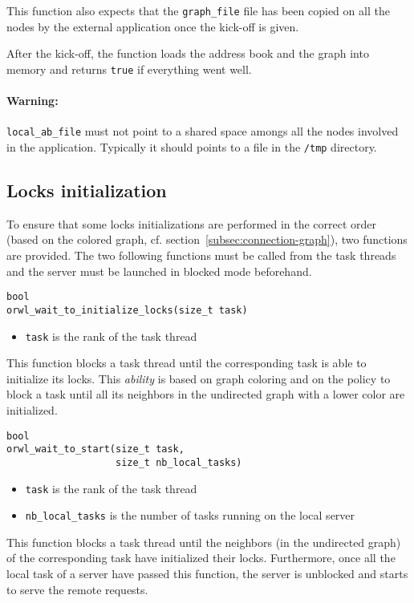 \documentclass[10pt]{article}
\begin{document}
This function also expects that the \texttt{graph\_file} file has been
copied on all the nodes by the external application once the kick-off
is given.

After the kick-off, the function loads the address book and the graph
into memory and returns \texttt{true} if everything went well.

\paragraph{Warning:} \texttt{local\_ab\_file} must not point to a
shared space amongs all the nodes involved in the
application. Typically it should points to a file in the \texttt{/tmp}
directory. 

\subsection{Locks initialization}
To ensure that some locks initializations are performed in the
correct order (based on the colored graph,
cf. section~\ref{subsec:connection-graph}), two functions are
provided. The two following functions must be called from the task
threads and the server must be launched in blocked mode beforehand.

\begin{verbatim}
bool
orwl_wait_to_initialize_locks(size_t task)
\end{verbatim}
\begin{itemize}
\item \texttt{task} is the rank of the task thread
\end{itemize}

This function blocks a task thread until the corresponding task is
able to initialize its locks. This \textit{ability} is based on graph
coloring and on the policy to block a task until all its neighbors in
the undirected graph with a lower color are initialized.

\begin{verbatim}
bool
orwl_wait_to_start(size_t task,
                   size_t nb_local_tasks)
\end{verbatim}
\begin{itemize}
\item \texttt{task} is the rank of the task thread
\item \texttt{nb\_local\_tasks} is the number of tasks running on the
  local server
\end{itemize}

This function blocks a task thread until the neighbors (in the
undirected graph) of the corresponding task have initialized their
locks. Furthermore, once all the local task of a server have passed
this function, the server is unblocked and starts to serve the remote
requests.
\end{document}
